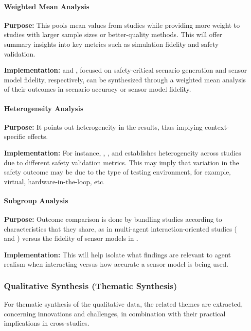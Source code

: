 \documentclass[lettersize,journal]{IEEEtran}
\begin{document}
\paragraph{Weighted Mean Analysis}

\textbf{Purpose:} This pools mean values from studies while providing more weight to studies with larger sample sizes or better-quality methods. This will offer summary insights into key metrics such as simulation fidelity and safety validation.

\textbf{Implementation:} \cite{ref63} and \cite{ref65}, focused on safety-critical scenario generation and sensor model fidelity, respectively, can be synthesized through a weighted mean analysis of their outcomes in scenario accuracy or sensor model fidelity.

\paragraph{Heterogeneity Analysis}

\textbf{Purpose:} It points out heterogeneity in the results, thus implying context-specific effects.

\textbf{Implementation:} For instance, \cite{ref62}, \cite{ref64}, and \cite{ref65} establishes heterogeneity across studies due to different safety validation metrics. This may imply that variation in the safety outcome may be due to the type of testing environment, for example, virtual, hardware-in-the-loop, etc.

\paragraph{Subgroup Analysis}

\textbf{Purpose:} Outcome comparison is done by bundling studies according to characteristics that they share, as in multi-agent interaction-oriented studies (\cite{ref61} and \cite{ref62}) versus the fidelity of sensor models in \cite{ref65}.

\textbf{Implementation:} This will help isolate what findings are relevant to agent realism when interacting versus how accurate a sensor model is being used.

\subsubsection{Qualitative Synthesis (Thematic Synthesis)}

For thematic synthesis of the qualitative data, the related themes are extracted, concerning innovations and challenges, in combination with their practical implications in cross-studies.
\end{document}
